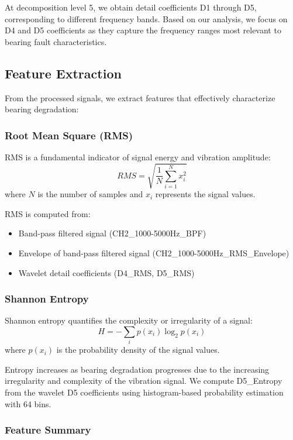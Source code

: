 \documentclass[conference,twocolumn]{IEEEtran}
\begin{document}
At decomposition level 5, we obtain detail coefficients D1 through D5, corresponding to different frequency bands. Based on our analysis, we focus on D4 and D5 coefficients as they capture the frequency ranges most relevant to bearing fault characteristics.

\subsection{Feature Extraction}

From the processed signals, we extract features that effectively characterize bearing degradation:

\subsubsection{Root Mean Square (RMS)}

RMS is a fundamental indicator of signal energy and vibration amplitude:
\begin{equation}
    RMS = \sqrt{\frac{1}{N} \sum_{i=1}^{N} x_i^2}
\end{equation}
where $N$ is the number of samples and $x_i$ represents the signal values.

RMS is computed from:
\begin{itemize}
    \item Band-pass filtered signal (CH2\_1000-5000Hz\_BPF)
    \item Envelope of band-pass filtered signal (CH2\_1000-5000Hz\_RMS\_Envelope)
    \item Wavelet detail coefficients (D4\_RMS, D5\_RMS)
\end{itemize}

\subsubsection{Shannon Entropy}

Shannon entropy quantifies the complexity or irregularity of a signal:
\begin{equation}
    H = -\sum_{i} p(x_i) \log_2 p(x_i)
\end{equation}
where $p(x_i)$ is the probability density of the signal values.

Entropy increases as bearing degradation progresses due to the increasing irregularity and complexity of the vibration signal. We compute D5\_Entropy from the wavelet D5 coefficients using histogram-based probability estimation with 64 bins.

\subsubsection{Feature Summary}
\end{document}
